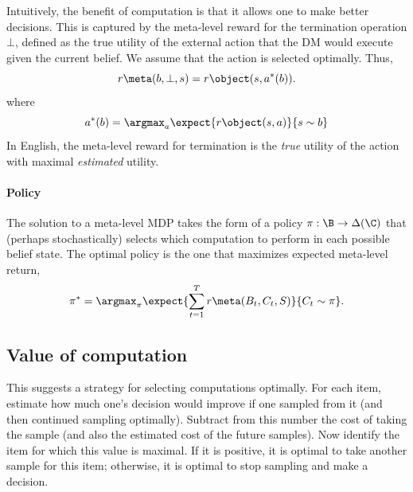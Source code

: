 Intuitively, the benefit of computation is that it allows one to make better decisions. This is captured by the meta-level reward for the termination operation $\bot$, defined as the true utility of the external action that the DM would execute given the current belief. We assume that the action is selected optimally. Thus,
%
\begin{equation}\label{eq:term-reward}
r\meta(b, \bot, s) = r\object(s, a^*(b)).
\end{equation}
%
where
%
\begin{equation}\label{eq:object-action}
a^*(b) = \argmax_a \expect{r\object(s, a)}{s \sim b}
\end{equation}
%
In English, the meta-level reward for termination is the \emph{true} utility of the action\footnotemark{} with maximal \emph{estimated} utility.


\paragraph{Policy}\label{sec:metamdp-policy}

The solution to a meta-level MDP takes the form of a policy $\pi: \B \rightarrow \Delta(\C)$ that (perhaps stochastically) selects which computation to perform in each possible belief state. The optimal policy is the one that maximizes expected meta-level return,
%
\begin{equation}\label{eq:optimal-policy}
  \pi^* = \argmax_\pi \expect{
    \sum_{t=1}^T r\meta(B_t, C_t, S)
  }{
    C_t \sim \pi
  }.
\end{equation}


\subsection{Value of computation}

This suggests a strategy for selecting computations optimally. For each item, estimate how much one's decision would improve if one sampled from it (and then continued sampling optimally). Subtract from this number the cost of taking the sample (and also the estimated cost of the future samples). Now identify the item for which this value is maximal. If it is positive, it is optimal to take another sample for this item; otherwise, it is optimal to stop sampling and make a decision.

